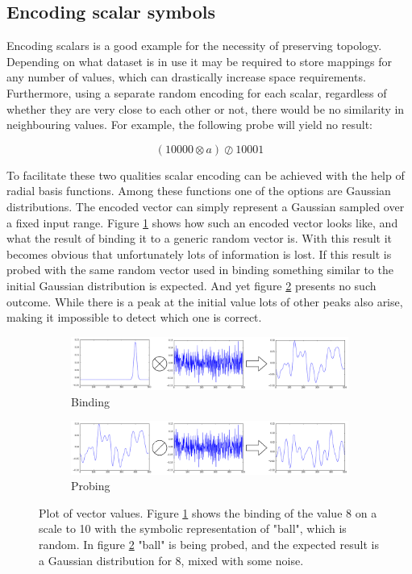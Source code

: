 \documentclass[conference]{IEEEtran}
\begin{document}
	\subsection{Encoding scalar symbols}
	
	Encoding scalars is a good example for the necessity of preserving topology.
Depending on what dataset is in use it may be required to store mappings for any number of values, which can drastically increase space requirements.
Furthermore, using a separate random encoding for each scalar, regardless of whether they are very close to each other or not, there would be no similarity in neighbouring values.
For example, the following probe will yield no result:
	
	\begin{equation}
	(10000 \otimes a) \oslash 10001
	\end{equation}
	
	To facilitate these two qualities scalar encoding can be achieved with the help of radial basis functions. Among these functions one of the options are Gaussian distributions.
The encoded vector can simply represent a Gaussian sampled over a fixed input range.
Figure \ref{no-perm-a} shows how such an encoded vector looks like, and what the result of binding it to a generic random vector is.
With this result it becomes obvious that unfortunately lots of information is lost.
If this result is probed with the same random vector used in binding something similar to the initial Gaussian distribution is expected.
And yet figure \ref{no-perm-b} presents no such outcome.
While there is a peak at the initial value lots of other peaks also arise, making it impossible to detect which one is correct.

	
	\begin{figure}[th!]
		\begin{subfigure}{1\columnwidth}
			\includegraphics[width=\columnwidth]{img/scalar-pre-perm.png}
			\caption{Binding}
			\label{no-perm-a}
		\end{subfigure}
		\begin{subfigure}{1\columnwidth}
			\includegraphics[width=\columnwidth]{img/scalar-pre-perm-probe.png}
			\caption{Probing}
			\label{no-perm-b}
		\end{subfigure}
		\caption{Plot of vector values.
Figure \ref{no-perm-a} shows the binding of the value 8 on a scale to 10 with the symbolic representation of "ball", which is random.
In figure \ref{no-perm-b} "ball" is being probed, and the expected result is a Gaussian distribution for 8, mixed with some noise.}
		\label{no-perm}
	\end{figure}
	
\end{document}

